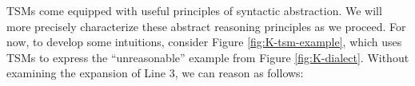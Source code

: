 \documentclass[acmlarge,review,anonymous]{acmart}\settopmatter{printfolios=true}
\begin{document}






TSMs come equipped with useful principles of syntactic abstraction. We will more precisely characterize these abstract reasoning principles as we proceed. For now, to develop some intuitions, consider Figure \ref{fig:K-tsm-example}, which uses TSMs to express the ``unreasonable'' example from Figure \ref{fig:K-dialect}. Without examining the expansion of Line 3, we can reason as follows:
\end{document}
